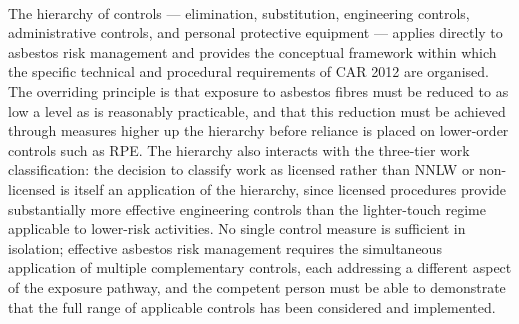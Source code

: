 \paragraph{}
The hierarchy of controls — elimination, substitution, engineering controls, administrative controls, and personal protective equipment — applies directly to asbestos risk management and provides the conceptual framework within which the specific technical and procedural requirements of CAR 2012 are organised. The overriding principle is that exposure to asbestos fibres must be reduced to as low a level as is reasonably practicable, and that this reduction must be achieved through measures higher up the hierarchy before reliance is placed on lower-order controls such as RPE. The hierarchy also interacts with the three-tier work classification: the decision to classify work as licensed rather than NNLW or non-licensed is itself an application of the hierarchy, since licensed procedures provide substantially more effective engineering controls than the lighter-touch regime applicable to lower-risk activities. No single control measure is sufficient in isolation; effective asbestos risk management requires the simultaneous application of multiple complementary controls, each addressing a different aspect of the exposure pathway, and the competent person must be able to demonstrate that the full range of applicable controls has been considered and implemented.

